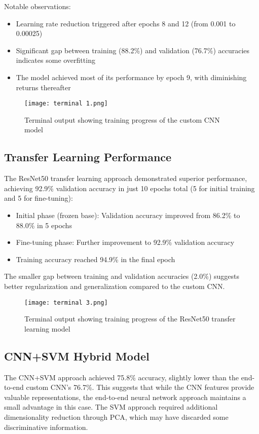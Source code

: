 \documentclass[12pt]{article}
\begin{document}
Notable observations:
\begin{itemize}
    \item Learning rate reduction triggered after epochs 8 and 12 (from 0.001 to 0.00025)
    \item Significant gap between training (88.2\%) and validation (76.7\%) accuracies indicates some overfitting
    \item The model achieved most of its performance by epoch 9, with diminishing returns thereafter
\end{itemize}

\begin{figure}[H]
    \centering
    \texttt{[image: terminal 1.png]}
    \caption{Terminal output showing training progress of the custom CNN model}
    \label{fig:scratch_terminal}
\end{figure}

\subsection{Transfer Learning Performance}
The ResNet50 transfer learning approach demonstrated superior performance, achieving 92.9\% validation accuracy in just 10 epochs total (5 for initial training and 5 for fine-tuning):

\begin{itemize}
    \item Initial phase (frozen base): Validation accuracy improved from 86.2\% to 88.0\% in 5 epochs
    \item Fine-tuning phase: Further improvement to 92.9\% validation accuracy
    \item Training accuracy reached 94.9\% in the final epoch
\end{itemize}

The smaller gap between training and validation accuracies (2.0\%) suggests better regularization and generalization compared to the custom CNN.

\begin{figure}[H]
    \centering
    \texttt{[image: terminal 3.png]}
    \caption{Terminal output showing training progress of the ResNet50 transfer learning model}
    \label{fig:transfer_terminal}
\end{figure}

\subsection{CNN+SVM Hybrid Model}
The CNN+SVM approach achieved 75.8\% accuracy, slightly lower than the end-to-end custom CNN's 76.7\%. This suggests that while the CNN features provide valuable representations, the end-to-end neural network approach maintains a small advantage in this case. The SVM approach required additional dimensionality reduction through PCA, which may have discarded some discriminative information.
\end{document}
